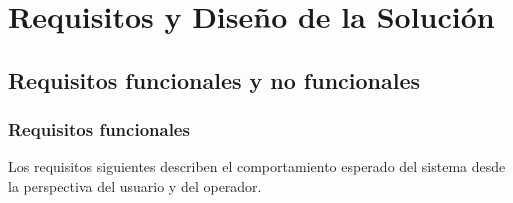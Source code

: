 \chapter{Requisitos y Diseño de la Solución}
\label{ch:requisitos-diseno}

\section{Requisitos funcionales y no funcionales}

\subsection{Requisitos funcionales}

Los requisitos siguientes describen el comportamiento esperado del sistema desde la perspectiva
del usuario y del operador.

